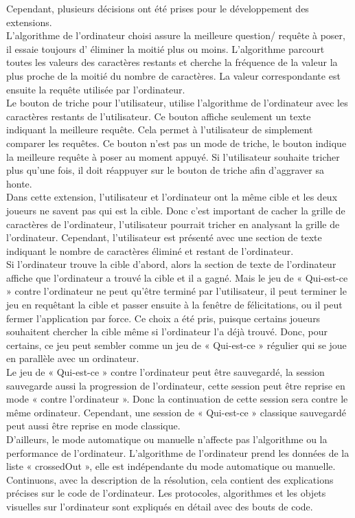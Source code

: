 \documentclass[a4paper]{article}
\begin{document}
Cependant, plusieurs décisions ont été prises pour le développement des extensions.\\
L’algorithme de l’ordinateur choisi assure la meilleure question/ requête à poser, il essaie toujours d' éliminer la moitié plus ou moins. L’algorithme parcourt toutes les valeurs des caractères restants et cherche la fréquence de la valeur la plus proche de la moitié du nombre de caractères. La valeur correspondante est ensuite la requête utilisée par l’ordinateur.\\
Le bouton de triche pour l’utilisateur, utilise l’algorithme de l’ordinateur avec les caractères restants de l’utilisateur. Ce bouton affiche seulement un texte indiquant la meilleure requête. Cela permet à l’utilisateur de simplement comparer les requêtes. Ce bouton n’est pas un mode de triche, le bouton indique la meilleure requête à poser au moment appuyé. Si l’utilisateur souhaite tricher plus qu’une fois, il doit réappuyer sur le bouton de triche afin d’aggraver sa honte.\\
Dans cette extension, l’utilisateur et l’ordinateur ont la même cible et les deux joueurs ne savent pas qui est la cible. Donc c’est important de cacher la grille de caractères de l’ordinateur, l’utilisateur pourrait tricher en analysant la grille de l’ordinateur. Cependant, l’utilisateur est présenté avec une section de texte indiquant le nombre de caractères éliminé et restant de l’ordinateur.\\
Si l’ordinateur trouve la cible d’abord, alors la section de texte de l'ordinateur affiche que l’ordinateur a trouvé la cible et il a gagné. Mais le jeu de « Qui-est-ce » contre l’ordinateur ne peut qu’être terminé par l’utilisateur, il peut terminer le jeu en requêtant la cible et passer ensuite à la fenêtre de félicitations, ou il peut fermer l’application par force. Ce choix a été pris, puisque certains joueurs souhaitent chercher la cible même si l’ordinateur l’a déjà trouvé. Donc, pour certains, ce jeu peut sembler comme un jeu de « Qui-est-ce » régulier qui se joue en parallèle avec un ordinateur.\\
Le jeu de « Qui-est-ce » contre l’ordinateur peut être sauvegardé, la session sauvegarde aussi la progression de l’ordinateur, cette session peut être reprise en mode « contre l’ordinateur ». Donc la continuation de cette session sera contre le même ordinateur. Cependant, une session de « Qui-est-ce » classique sauvegardé peut aussi être reprise en mode classique.\\
D’ailleurs, le mode automatique ou manuelle n'affecte pas l’algorithme ou la performance de l’ordinateur. L’algorithme de l’ordinateur prend les données de la liste « crossedOut », elle est indépendante du mode automatique ou manuelle.\\
Continuons, avec la description de la résolution, cela contient des explications précises sur le code de l’ordinateur. Les protocoles, algorithmes et les objets visuelles sur l’ordinateur sont expliqués en détail avec des bouts de code.\\
\end{document}
